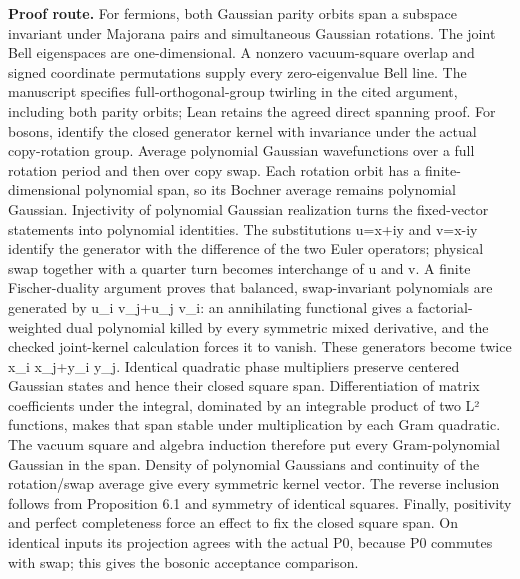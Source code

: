 \textbf{Proof route.} For fermions, both Gaussian parity orbits span a subspace invariant under Majorana pairs and simultaneous Gaussian rotations. The joint Bell eigenspaces are one-dimensional. A nonzero vacuum-square overlap and signed coordinate permutations supply every zero-eigenvalue Bell line. The manuscript specifies full-orthogonal-group twirling in the cited argument, including both parity orbits; Lean retains the agreed direct spanning proof. For bosons, identify the closed generator kernel with invariance under the actual copy-rotation group. Average polynomial Gaussian wavefunctions over a full rotation period and then over copy swap. Each rotation orbit has a finite-dimensional polynomial span, so its Bochner average remains polynomial Gaussian. Injectivity of polynomial Gaussian realization turns the fixed-vector statements into polynomial identities. The substitutions u=x+iy and v=x-iy identify the generator with the difference of the two Euler operators; physical swap together with a quarter turn becomes interchange of u and v. A finite Fischer-duality argument proves that balanced, swap-invariant polynomials are generated by u\_i v\_j+u\_j v\_i: an annihilating functional gives a factorial-weighted dual polynomial killed by every symmetric mixed derivative, and the checked joint-kernel calculation forces it to vanish. These generators become twice x\_i x\_j+y\_i y\_j. Identical quadratic phase multipliers preserve centered Gaussian states and hence their closed square span. Differentiation of matrix coefficients under the integral, dominated by an integrable product of two L² functions, makes that span stable under multiplication by each Gram quadratic. The vacuum square and algebra induction therefore put every Gram-polynomial Gaussian in the span. Density of polynomial Gaussians and continuity of the rotation/swap average give every symmetric kernel vector. The reverse inclusion follows from Proposition 6.1 and symmetry of identical squares. Finally, positivity and perfect completeness force an effect to fix the closed square span. On identical inputs its projection agrees with the actual P0, because P0 commutes with swap; this gives the bosonic acceptance comparison.

